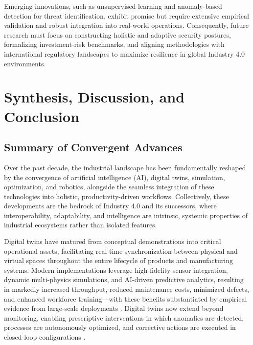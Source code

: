 Emerging innovations, such as unsupervised learning and anomaly-based detection for threat identification, exhibit promise but require extensive empirical validation and robust integration into real-world operations. Consequently, future research must focus on constructing holistic and adaptive security postures, formalizing investment-risk benchmarks, and aligning methodologies with international regulatory landscapes to maximize resilience in global Industry 4.0 environments.

\section{Synthesis, Discussion, and Conclusion}

\subsection{Summary of Convergent Advances}

Over the past decade, the industrial landscape has been fundamentally reshaped by the convergence of artificial intelligence (AI), digital twins, simulation, optimization, and robotics, alongside the seamless integration of these technologies into holistic, productivity-driven workflows. Collectively, these developments are the bedrock of Industry 4.0 and its successors, where interoperability, adaptability, and intelligence are intrinsic, systemic properties of industrial ecosystems rather than isolated features.

Digital twins have matured from conceptual demonstrations into critical operational assets, facilitating real-time synchronization between physical and virtual spaces throughout the entire lifecycle of products and manufacturing systems. Modern implementations leverage high-fidelity sensor integration, dynamic multi-physics simulations, and AI-driven predictive analytics, resulting in markedly increased throughput, reduced maintenance costs, minimized defects, and enhanced workforce training—with these benefits substantiated by empirical evidence from large-scale deployments \cite{ref38}. Digital twins now extend beyond monitoring, enabling prescriptive interventions in which anomalies are detected, processes are autonomously optimized, and corrective actions are executed in closed-loop configurations \cite{ref41}\cite{ref43}.

